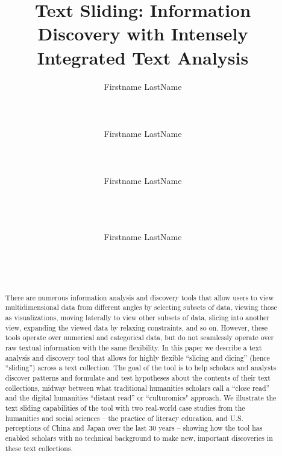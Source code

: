 \documentclass{sig-alternate}
\begin{document}
\title{Text Sliding: Information Discovery with Intensely Integrated Text Analysis}

\author{%
\alignauthor Firstname LastName\\
       \\
       \\
       \\
\alignauthor Firstname LastName\\
       \\
       \\
       \\
\alignauthor Firstname LastName\\
       \\
       \\
       \\
\and
\alignauthor Firstname LastName\\
       \\
       \\
       \\
}

\maketitle

\begin{abstract}
There are numerous information analysis and discovery tools that allow users to view multidimensional data from different angles by selecting subsets of data, viewing those as visualizations, moving laterally to view other subsets of data, slicing into another view, expanding the viewed data by relaxing constraints, and so on.  However, these tools operate over numerical and categorical data, but do not seamlessly operate over raw textual information with the same flexibility. In this paper we describe a text analysis and discovery tool that allows for highly flexible  ``slicing and dicing'' (hence  ``sliding'') across a text collection.  The goal of the tool is to help scholars and analysts discover patterns and formulate and test hypotheses about the contents of their text collections, midway between what traditional humanities scholars call a  ``close read'' and the digital humanities  ``distant read'' or ``culturomics" approach.  We illustrate the text sliding capabilities of the tool with two real-world case studies from the humanities and social sciences -- the practice of literacy education, and U.S. perceptions of China and Japan over the last 30 years -- showing how the tool has enabled scholars with no technical background to make new, important discoveries in these text collections.

\end{abstract}
\end{document}
